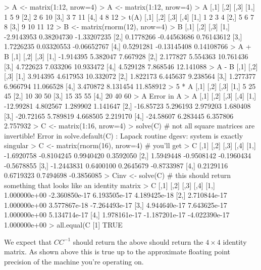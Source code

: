 \begin{R}
> A <- matrix(1:12, nrow=4)
> A <- matrix(1:12, nrow=4)
> A
     [,1] [,2] [,3]
[1,]    1    5    9
[2,]    2    6   10
[3,]    3    7   11
[4,]    4    8   12
> t(A)
     [,1] [,2] [,3] [,4]
[1,]    1    2    3    4
[2,]    5    6    7    8
[3,]    9   10   11   12
> B <- matrix(rnorm(12), nrow=4)
> B
           [,1]        [,2]        [,3]
[1,] -2.9143953  0.38204730 -1.33207235
[2,]  0.1778266 -0.44563686  0.76143612
[3,]  1.7226235  0.03320553 -0.06652767
[4,]  0.5291281 -0.13145408  0.14108766
> A + B
          [,1]     [,2]      [,3]
[1,] -1.914395 5.382047  7.667928
[2,]  2.177827 5.554363 10.761436
[3,]  4.722623 7.033206 10.933472
[4,]  4.529128 7.868546 12.141088
> A - B
         [,1]     [,2]      [,3]
[1,] 3.914395 4.617953 10.332072
[2,] 1.822173 6.445637  9.238564
[3,] 1.277377 6.966794 11.066528
[4,] 3.470872 8.131454 11.858912
> 5 * A
     [,1] [,2] [,3]
[1,]    5   25   45
[2,]   10   30   50
[3,]   15   35   55
[4,]   20   40   60
> A %
Error in A %
> A %
          [,1]     [,2]     [,3]     [,4]
[1,] -12.99281 4.802567 1.289902 1.141647
[2,] -16.85723 5.296193 2.979203 1.680408
[3,] -20.72165 5.789819 4.668505 2.219170
[4,] -24.58607 6.283445 6.357806 2.757932
> C <- matrix(1:16, nrow=4)
> solve(C)  # not all square matrices are invertible!
Error in solve.default(C) : Lapack routine dgesv: system is exactly singular
> C <- matrix(rnorm(16), nrow=4)  # you'll get
> C
           [,1]       [,2]       [,3]       [,4]
[1,] -1.6920758 -0.8104245  0.9940420  0.3592050
[2,]  1.5949448 -0.9508142 -0.1960434 -0.5678855
[3,] -1.2443831  0.6400100  0.2645679 -0.8733987
[4,]  0.2129116  0.6719323  0.7494698 -0.3856085
> Cinv <- solve(C)  # this should return something that looks like an identity matrix
> C %
             [,1]          [,2]          [,3]          [,4]
[1,] 1.000000e+00 -2.360850e-17  6.193505e-17  4.189425e-18
[2,] 2.710844e-17  1.000000e+00  3.577867e-18 -7.264493e-17
[3,] 4.944640e-17  7.643625e-17  1.000000e+00  5.134714e-17
[4,] 1.978161e-17 -1.187201e-17 -4.022390e-17  1.000000e+00
> all.equal(C %
[1] TRUE
\end{R}


We expect that $CC^{-1}$ should return the above should return the
$4 \times 4$ identity matrix. As shown above this is true up to the
approximate floating point precision of the machine you're operating on.



